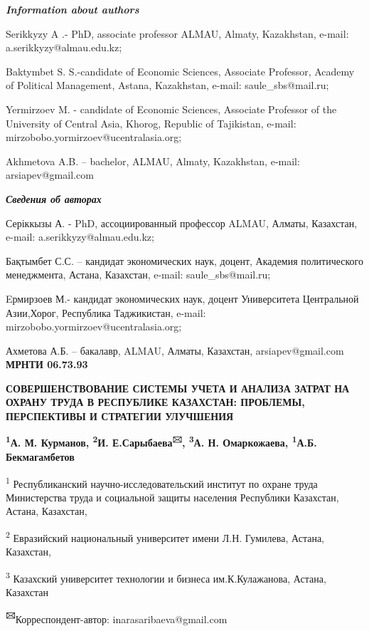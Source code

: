 \emph{{\bfseries Information about authors}}

Serikkyzy A .- PhD, associate professor ALMAU, Almaty, Kazakhstan,
e-mail: a.serikkyzy@almau.edu.kz;

Baktymbet S. S.-candidate of Economic Sciences, Associate Professor,
Academy of Political Management, Astana, Kazakhstan, e-mail:
saule\_sbs@mail.ru;

Yermirzoev M. - candidate of Economic Sciences, Associate Professor of
the University of Central Asia, Khorog, Republic of Tajikistan, e-mail:
mirzobobo.yormirzoev@ucentralasia.org;

Akhmetova A.B. -- bachelor, ALMAU, Almaty, Kazakhstan, e-mail:
arsiapev@gmail.com

\emph{{\bfseries Сведения об авторах}}

Серіккызы А. - PhD, ассоциированный профессор ALMAU, Алматы, Казахстан,
e-mail: a.serikkyzy@almau.edu.kz;

Бақтымбет С.С. -- кандидат экономических наук, доцент, Академия
политического менеджмента, Астана, Казахстан, e-mail:
saule\_sbs@mail.ru;

Eрмирзоев М.- кандидат экономических наук, доцент Университета
Центральной Азии,Хорог, Республика Таджикистан, e-mail:
mirzobobo.yormirzoev@ucentralasia.org;

Ахметова А.Б. -- бакалавр, ALMAU, Алматы, Казахстан, arsiapev@gmail.com\newpage
{\bfseries МРНТИ 06.73.93}

{\bfseries СОВЕРШЕНСТВОВАНИЕ СИСТЕМЫ УЧЕТА И АНАЛИЗА ЗАТРАТ НА ОХРАНУ ТРУДА
В РЕСПУБЛИКЕ КАЗАХСТАН: ПРОБЛЕМЫ, ПЕРСПЕКТИВЫ И СТРАТЕГИИ УЛУЧШЕНИЯ}

{\bfseries \textsuperscript{1}А. М. Курманов, \textsuperscript{2}И.
Е.Сарыбаева\textsuperscript{🖂}, \textsuperscript{3}А. Н. Омаркожаева,
\textsuperscript{1}А.Б. Бекмагамбетов}

\textsuperscript{1} Республиканский научно-исследовательский институт по
охране труда Министерства труда и социальной защиты населения Республики
Казахстан, Астана, Казахстан,

\textsuperscript{2} Евразийский национальный университет имени Л.Н.
Гумилева, Астана, Казахстан,

\textsuperscript{3} Казахский университет технологии и бизнеса
им.К.Кулажанова, Астана, Казахстан

{\bfseries \textsuperscript{🖂}}Корреспондент-автор:
inarasaribaeva@gmail.com

